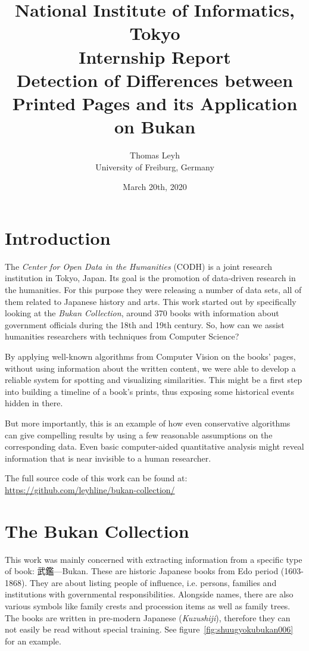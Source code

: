 \documentclass{ltjarticle}
\title{\large National Institute of Informatics, Tokyo \\ Internship Report \\ \LARGE Detection of Differences between Printed Pages and its Application on Bukan}
\author{Thomas Leyh \\ University of Freiburg, Germany}
\date{March 20th, 2020}
\begin{document}
\clearpage\maketitle
\thispagestyle{empty}

\tableofcontents

\pagebreak
\setcounter{page}{1}

\section{Introduction}

The \emph{Center for Open Data in the Humanities} (CODH) is a joint research institution in Tokyo, Japan. Its goal is the promotion of data-driven research in the humanities.\cite{kitamoto2017codh} For this purpose they were releasing a number of data sets, all of them related to Japanese history and arts. This work started out by specifically looking at the \emph{Bukan Collection}\cite{codh2018bukan}, around 370 books with information about government officials during the 18th and 19th century. So, how can we assist humanities researchers with techniques from Computer Science?

By applying well-known algorithms from Computer Vision on the books' pages, without using information about the written content, we were able to develop a reliable system for spotting and visualizing similarities. This might be a first step into building a timeline of a book's prints, thus exposing some historical events hidden in there.

But more importantly, this is an example of how even conservative algorithms can give compelling results by using a few reasonable assumptions on the corresponding data. Even basic computer-aided quantitative analysis might reveal information that is near invisible to a human researcher.

The full source code of this work can be found at: \url{https://github.com/leyhline/bukan-collection/}

\section{The Bukan Collection}

This work was mainly concerned with extracting information from a specific type of book: 武鑑---Bukan. These are historic Japanese books from Edo period (1603-1868). They are about listing people of influence, i.e. persons, families and institutions with governmental responsibilities. Alongside names, there are also various symbols like family crests and procession items as well as family trees. The books are written in pre-modern Japanese (\emph{Kuzushiji}), therefore they can not easily be read without special training. See figure~\ref{fig:shuugyokubukan006} for an example.
\end{document}
